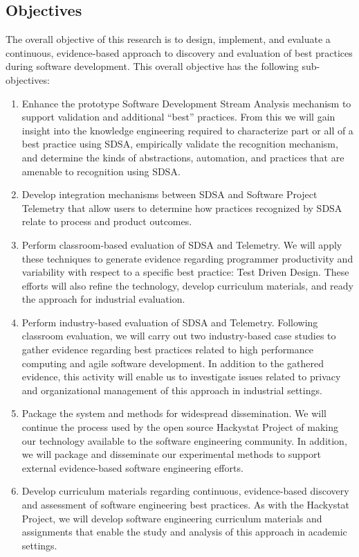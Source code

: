 \subsection{Objectives}
\label{sec:objectives}

The overall objective of this research is to design, implement, and
evaluate a continuous, evidence-based approach to discovery and
evaluation of best practices during software development.
This overall objective has the following sub-objectives:
\begin{enumerate}
  
\item Enhance the prototype Software Development Stream
  Analysis mechanism to support validation and additional ``best''
  practices.  From this we will gain insight into the knowledge engineering
  required to characterize part or all of a best practice using SDSA,
  empirically validate the recognition mechanism, and determine the 
  kinds of abstractions, automation, and practices that are amenable to
  recognition using SDSA.

\item Develop integration mechanisms between SDSA and Software
  Project Telemetry that allow users to determine how practices
  recognized by SDSA relate to process and product outcomes. 
  
\item Perform classroom-based evaluation of SDSA and Telemetry. We
will apply these techniques to generate evidence regarding programmer
productivity and variability with respect to a specific best practice: Test
Driven Design.  These efforts will also refine the technology, develop
curriculum materials, and ready the approach for industrial evaluation.

\item Perform industry-based evaluation of SDSA and Telemetry. Following
classroom evaluation, we will carry out two industry-based case studies to
gather evidence regarding best practices related to high performance
computing and agile software development. In addition to the gathered evidence,
this activity will enable us to investigate issues related to privacy and 
organizational management of this approach in industrial settings. 
  
\item Package the system and methods for widespread dissemination.  We
will continue the process used by the open source Hackystat Project of
making our technology available to the software engineering community.  In
addition, we will package and disseminate our experimental methods to
support external evidence-based software engineering efforts.
  
\item Develop curriculum materials regarding continuous,
  evidence-based discovery and assessment of software engineering best
  practices. As with the Hackystat Project, we will develop software
  engineering curriculum materials and assignments that enable the study
  and analysis of this approach in academic settings.

\end{enumerate}


